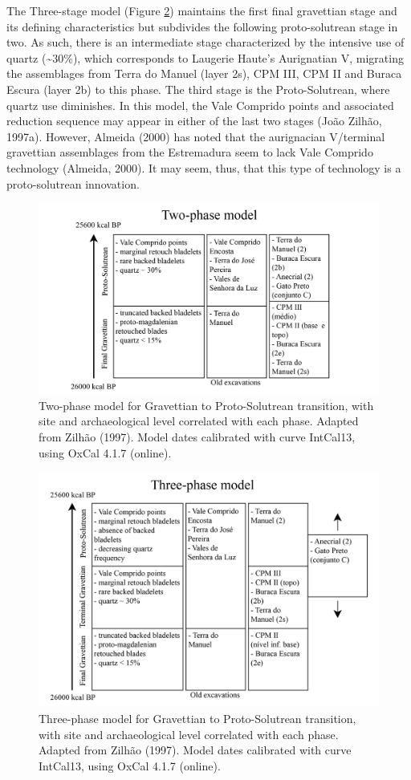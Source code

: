\documentclass[12pt,twoside]{reedthesis}
\begin{document}
The Three-stage model (Figure \ref{fig:threephase}) maintains the first final gravettian stage and its defining characteristics but subdivides the following proto-solutrean stage in two. As such, there is an intermediate stage characterized by the intensive use of quartz (\textasciitilde30\%), which corresponds to Laugerie Haute's Aurignatian V, migrating the assemblages from Terra do Manuel (layer 2s), CPM III, CPM II and Buraca Escura (layer 2b) to this phase. The third stage is the Proto-Solutrean, where quartz use diminishes. In this model, the Vale Comprido points and associated reduction sequence may appear in either of the last two stages (João Zilhão, 1997a). However, Almeida (2000) has noted that the aurignacian V/terminal gravettian assemblages from the Estremadura seem to lack Vale Comprido technology (Almeida, 2000). It may seem, thus, that this type of technology is a proto-solutrean innovation.
\begin{figure}[H]

{\centering \includegraphics[width=0.7\linewidth]{figure/Two-phasemodel} 

}

\caption{Two-phase model for Gravettian to Proto-Solutrean transition, with site and archaeological level correlated with each phase. Adapted from Zilhão (1997). Model dates calibrated with curve IntCal13, using OxCal 4.1.7 (online).}\label{fig:twophase}
\end{figure}
\begin{figure}[H]

{\centering \includegraphics[width=0.7\linewidth]{figure/Three-phasemodel} 

}

\caption{Three-phase model for Gravettian to Proto-Solutrean transition, with site and archaeological level correlated with each phase. Adapted from Zilhão (1997). Model dates calibrated with curve IntCal13, using OxCal 4.1.7 (online).}\label{fig:threephase}
\end{figure}
~
\end{document}

